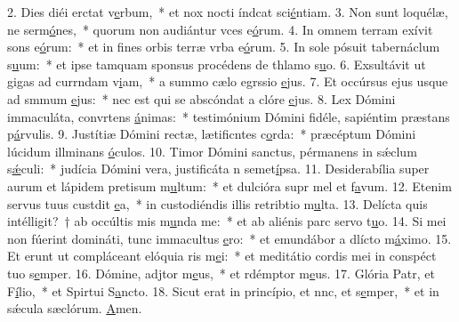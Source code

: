 2. Dies diéi erctat v\uline{e}rbum,~* et nox nocti índcat sci\uline{é}ntiam.
3. Non sunt loquélæ, ne serm\uline{ó}nes,~* quorum non audiántur vces e\uline{ó}rum.
4. In omnem terram exívit sons e\uline{ó}rum:~* et in fines orbis terræ vrba e\uline{ó}rum.
5. In sole pósuit tabernáclum s\uline{u}um:~* et ipse tamquam sponsus procédens de thlamo s\uline{u}o.
6. Exsultávit ut gigas ad currndam v\uline{i}am,~* a summo cælo egrssio \uline{e}jus.
7. Et occúrsus ejus usque ad smmum \uline{e}jus:~* nec est qui se abscóndat a clóre \uline{e}jus.
8. Lex Dómini immaculáta, convrtens \uline{á}nimas:~* testimónium Dómini fidéle, sapiéntim præstans p\uline{á}rvulis.
9. Justítiæ Dómini rectæ, lætificntes c\uline{o}rda:~* præcéptum Dómini lúcidum illminans \uline{ó}culos.
10. Timor Dómini sanctus, pérmanens in sǽclum s\uline{ǽ}culi:~* judícia Dómini vera, justificáta n semet\uline{í}psa.
11. Desiderabília super aurum et lápidem pretisum m\uline{u}ltum:~* et dulcióra supr mel et f\uline{a}vum.
12. Etenim servus tuus custdit \uline{e}a,~* in custodiéndis illis retribtio m\uline{u}lta.
13. Delícta quis intélligit?~† ab occúltis mis m\uline{u}nda me:~* et ab aliénis parc servo t\uline{u}o.
14. Si mei non fúerint domináti, tunc immacultus \uline{e}ro:~* et emundábor a dlícto m\uline{á}ximo.
15. Et erunt ut compláceant elóquia ris m\uline{e}i:~* et meditátio cordis mei in conspéct tuo s\uline{e}mper.
16. Dómine, adjtor m\uline{e}us,~* et rdémptor m\uline{e}us.
17. Glória Patr, et F\uline{í}lio,~* et Spirtui S\uline{a}ncto.
18. Sicut erat in princípio, et nnc, et s\uline{e}mper,~* et in sǽcula sæclórum. \uline{A}men.
